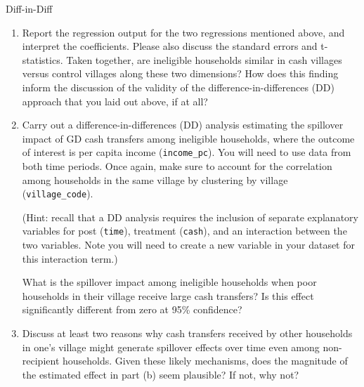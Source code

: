 \begin{homeworkProblem}{Diff-in-Diff}
\begin{enumerate}
        \begin{enumerate}
            \item Report the regression output for the two regressions 
                mentioned above, and interpret the coefficients. Please 
                also discuss the standard errors and t-statistics. Taken 
                together, are ineligible households similar in cash 
                villages versus control villages along these two 
                dimensions? How does this finding inform the discussion of 
                the validity of the difference-in-differences (DD) 
                approach that you laid out above, if at all?
            \item Carry out a difference-in-differences (DD) analysis 
                estimating the spillover impact of GD cash transfers 
                among ineligible households, where the outcome of interest 
                is per capita income (\texttt{income\_pc}). You will need 
                to use data from both time periods. Once again, make sure 
                to account for the correlation among households in the 
                same village by clustering by village 
                (\texttt{village\_code}). 
                
                (Hint: recall that a DD analysis requires the inclusion 
                of separate explanatory variables for post 
                (\texttt{time}), treatment (\texttt{cash}), and an 
                interaction between the two variables. Note you will need 
                to create a new variable in your dataset for this 
                interaction term.) 
                
                What is the spillover impact among ineligible households 
                when poor households in their village receive large cash 
                transfers? Is this effect significantly different from 
                zero at 95\% confidence?
            \item Discuss at least two reasons why cash transfers 
                received by other households in one's village might 
                generate spillover effects over time even among 
                non-recipient households. Given these likely mechanisms, 
                does the magnitude of the estimated effect in part (b) 
                seem plausible? If not, why not?
        \end{enumerate}
    \end{enumerate}


\end{homeworkProblem}
